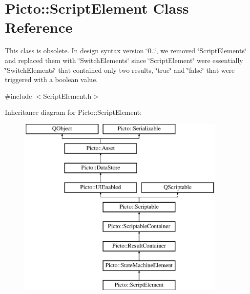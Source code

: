 \hypertarget{class_picto_1_1_script_element}{\section{Picto\-:\-:Script\-Element Class Reference}
\label{class_picto_1_1_script_element}
}


This class is obsolete. In design syntax version \char`\"{}0..\char`\"{}, we removed \char`\"{}\-Script\-Elements\char`\"{} and replaced them with \char`\"{}\-Switch\-Elements\char`\"{} since \char`\"{}\-Script\-Element\char`\"{} were essentially \char`\"{}\-Switch\-Elements\char`\"{} that contained only two results, \char`\"{}true\char`\"{} and \char`\"{}false\char`\"{} that were triggered with a boolean value.  




{\ttfamily \#include $<$Script\-Element.\-h$>$}

Inheritance diagram for Picto\-:\-:Script\-Element\-:\begin{figure}[H]
\begin{center}
\leavevmode
\includegraphics[height=9.000000cm]{class_picto_1_1_script_element}
\end{center}
\end{figure}

